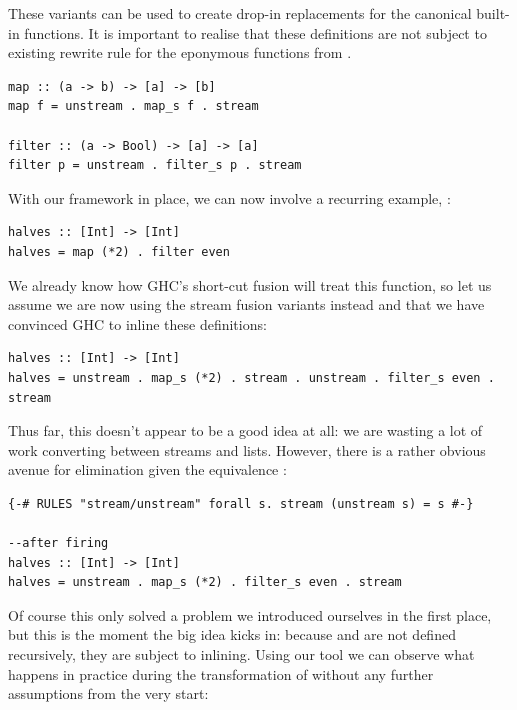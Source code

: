 These variants can be used to create drop-in replacements for the canonical built-in functions. It is important to realise that
these definitions are not subject to existing rewrite rule for the eponymous functions from .

\begin{listing}[H]
\begin{verbatim}
map :: (a -> b) -> [a] -> [b]
map f = unstream . map_s f . stream

filter :: (a -> Bool) -> [a] -> [a]
filter p = unstream . filter_s p . stream
\end{verbatim}
\end{listing}

With our framework in place, we can now involve a recurring example, :

\begin{listing}[H]
\begin{verbatim}
halves :: [Int] -> [Int]
halves = map (*2) . filter even
\end{verbatim}
\end{listing}

We already know how GHC's short-cut fusion will treat this function, so let us assume we are now using the stream fusion variants instead
and that we have convinced GHC to inline these definitions:

\begin{listing}[H]
\begin{verbatim}
halves :: [Int] -> [Int]
halves = unstream . map_s (*2) . stream . unstream . filter_s even . stream
\end{verbatim}
\end{listing}

Thus far, this doesn't appear to be a good idea at all: we are wasting a lot of work converting between streams and lists. However, there is a rather obvious
avenue for elimination given the equivalence :

\begin{listing}[H]
\begin{verbatim}
{-# RULES "stream/unstream" forall s. stream (unstream s) = s #-}

--after firing
halves :: [Int] -> [Int]
halves = unstream . map_s (*2) . filter_s even . stream
\end{verbatim}
\end{listing}

Of course this only solved a problem we introduced ourselves in the first place, but this is the moment the big idea kicks in: 
because  and  are not defined recursively, they are subject to inlining.
Using our tool we can observe what happens in practice during the transformation of 
without any further assumptions from the very start:

